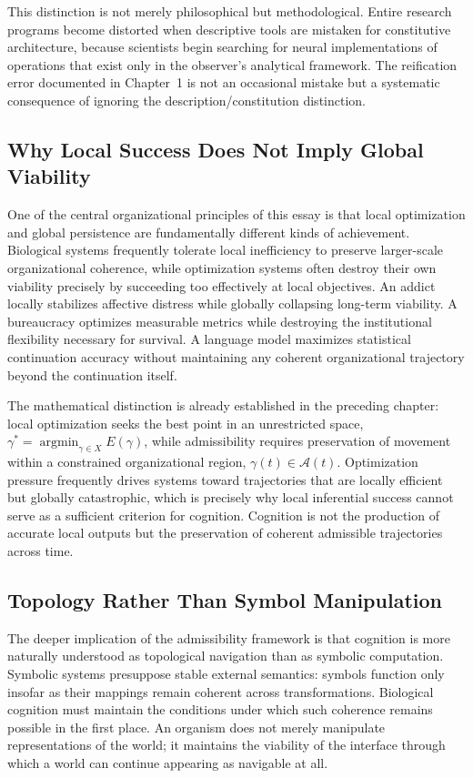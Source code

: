 \documentclass[12pt,a4paper]{report}
\theoremstyle{flyxion}
\begin{document}
This distinction is not merely philosophical but methodological. Entire research programs become distorted when descriptive tools are mistaken for constitutive architecture, because scientists begin searching for neural implementations of operations that exist only in the observer's analytical framework. The reification error documented in Chapter~1 is not an occasional mistake but a systematic consequence of ignoring the description/constitution distinction.

\subsection*{Why Local Success Does Not Imply Global Viability}

One of the central organizational principles of this essay is that local optimization and global persistence are fundamentally different kinds of achievement. Biological systems frequently tolerate local inefficiency to preserve larger-scale organizational coherence, while optimization systems often destroy their own viability precisely by succeeding too effectively at local objectives. An addict locally stabilizes affective distress while globally collapsing long-term viability. A bureaucracy optimizes measurable metrics while destroying the institutional flexibility necessary for survival. A language model maximizes statistical continuation accuracy without maintaining any coherent organizational trajectory beyond the continuation itself.

The mathematical distinction is already established in the preceding chapter: local optimization seeks the best point in an unrestricted space, $\gamma^* = \operatorname{argmin}_{\gamma \in X} E(\gamma)$, while admissibility requires preservation of movement within a constrained organizational region, $\gamma(t) \in \mathcal{A}(t)$. Optimization pressure frequently drives systems toward trajectories that are locally efficient but globally catastrophic, which is precisely why local inferential success cannot serve as a sufficient criterion for cognition. Cognition is not the production of accurate local outputs but the preservation of coherent admissible trajectories across time.

\subsection*{Topology Rather Than Symbol Manipulation}

The deeper implication of the admissibility framework is that cognition is more naturally understood as topological navigation than as symbolic computation. Symbolic systems presuppose stable external semantics: symbols function only insofar as their mappings remain coherent across transformations. Biological cognition must maintain the conditions under which such coherence remains possible in the first place. An organism does not merely manipulate representations of the world; it maintains the viability of the interface through which a world can continue appearing as navigable at all.
\end{document}

